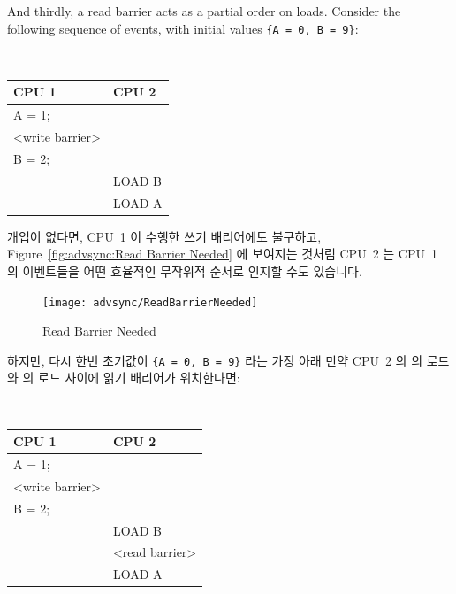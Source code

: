\begin{enumerate}
And thirdly, a read barrier acts as a partial order on loads.  Consider the
following sequence of events, with initial values
{\tt \{A = 0, B = 9\}}:
\fi

\vspace{5pt}
\begin{minipage}[t]{\columnwidth}
\tt
\scriptsize
\begin{tabular}{l|p{1.5in}}
	CPU 1 &		CPU 2 \\
	\hline
	A = 1; & \\
	<write barrier> & \\
	B = 2; & \\
		&	LOAD B \\
		&	LOAD A \\
\end{tabular}
\end{minipage}
\vspace{5pt}

개입이 없다면, CPU~1 이 수행한 쓰기 배리어에도 불구하고,
Figure~\ref{fig:advsync:Read Barrier Needed} 에 보여지는 것처럼 CPU~2 는 CPU~1
의 이벤트들을 어떤 효율적인 무작위적 순서로 인지할 수도 있습니다.

\begin{figure}[htb]
\begin{center}
\texttt{[image: advsync/ReadBarrierNeeded]}
\end{center}
\caption{Read Barrier Needed}
\end{figure}

하지만, 다시 한번 초기값이 {\tt \{A = 0, B = 9\}} 라는 가정 아래 만약 CPU~2 의
 의 로드와  의 로드 사이에 읽기 배리어가 위치한다면:

\vspace{5pt}
\begin{minipage}[t]{\columnwidth}
\tt
\scriptsize
\begin{tabular}{l|p{1.5in}}
	CPU 1 &		CPU 2 \\
	\hline
	A = 1; & \\
	<write barrier> & \\
	B = 2; & \\
		&	LOAD B \\
		&	<read barrier> \\
		&	LOAD A \\
\end{tabular}
\end{minipage}
\vspace{5pt}


\end{enumerate}
